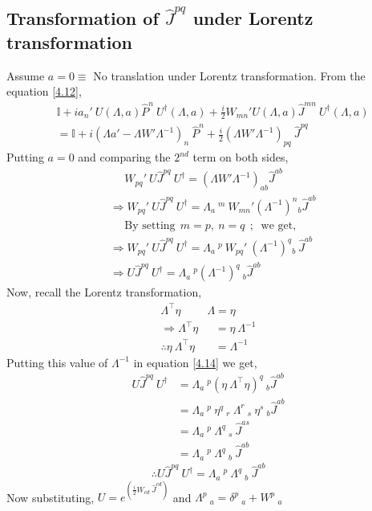 \documentclass[14pt]{article} %
\begin{document}
\subsection*{Transformation of $\hat{J}^{pq}$ under Lorentz transformation}
Assume $a = 0 \equiv$ No translation under Lorentz transformation. From the equation \eqref{4.12},
\begin{align*}
&\mathbb{I} + i a_n' ~U(\Lambda, a) \hat{P}^n~ U^\dagger(\Lambda, a) + \frac{i}{2} W_{mn}' U(\Lambda, a) \hat{J}^{mn}~U^\dagger(\Lambda, a) \\
&= \mathbb{I} + i {(\Lambda a'-\Lambda W' \Lambda^{-1})}_n~\hat{P}^n + \frac{i}{2} {(\Lambda W' \Lambda^{-1})}_{pq}~\hat{J}^{pq}
\end{align*}
Putting $a=0$ and comparing the $2^{nd}$ term on both sides,
\begin{align*}
&~~~~~~ W_{pq}'~ U \hat{J}^{pq}~ U^\dagger = (\Lambda W' \Lambda^{-1})_{ab} \hat{J}^{ab} \\
&\Rightarrow W_{pq}'~ U \hat{J}^{pq}~ U^\dagger = \Lambda_a~^m~ W_{mn}'(\Lambda^{-1})^n{}_b \hat{J}^{ab} \\
&~~~~~~\text{By setting}~~ m=p,~n=q ~~;~\text{ we get,} \\
&\Rightarrow W_{pq}'~ U \hat{J}^{pq}~ U^\dagger = \Lambda_a~^p~ W_{pq}' ~(\Lambda^{-1})^q{}_b~ \hat{J}^{ab} \\
&\Rightarrow U \hat{J}^{pq}~ U^\dagger = \Lambda_a~^p (\Lambda^{-1})^q~_b \hat{J}^{ab} \tag{4.14} \label{4.14}
\end{align*}
Now, recall the Lorentz transformation,
\begin{align*}
\Lambda^\top \eta~&\Lambda = \eta \\
\Rightarrow \Lambda^\top \eta &~~~= \eta~\Lambda^{-1} \\
\therefore\eta ~\Lambda^\top \eta &~~~= \Lambda^{-1} \tag{4.15} \label{4.15}
\end{align*}
Putting this value of $\Lambda^{-1}$ in equation \eqref{4.14} we get,
\begin{align*}
U \hat{J}^{pq}~ U^\dagger &= \Lambda_a~^p (\eta ~\Lambda^\top \eta)^q~_b \hat{J}^{ab} \\
&= \Lambda_a~^p~\eta^q~_r~\Lambda^r~_s~\eta^s~_b \hat{J}^{ab}  \\
&= \Lambda_a~^p~\Lambda^q~_s~\hat{J}^{as} \\
&= \Lambda_a~^p~\Lambda^q~_b~\hat{J}^{ab}
\end{align*}
\[
\boxed{\therefore U \hat{J}^{pq}~ U^\dagger = \Lambda_a~^p~\Lambda^q~_b~\hat{J}^{ab}}
\]
Now substituting, $ U=e^{ \left( \frac{i}{2}W_{cd}~\hat{J}^{cd} \right) }$ and $\Lambda^p~_a = \delta^p~_a + W^p~_a $
\end{document}
